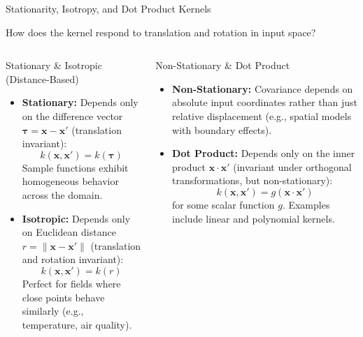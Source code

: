\documentclass[aspectratio=169, 10pt]{beamer}
\newcommand{\bx}{\mathbf{x}}
\begin{document}
\begin{frame}{Stationarity, Isotropy, and Dot Product Kernels}
  
  How does the kernel respond to translation and rotation in input space?
  
  \vspace{4pt}
  \begin{columns}[t]
      \begin{block}{Stationary \& Isotropic (Distance-Based)}
        \scriptsize
        \begin{itemize}
          \item \textbf{Stationary:} Depends only on the difference vector $\boldsymbol{\tau} = \bx - \bx'$ (translation invariant):
            \[ k(\bx, \bx') = k(\boldsymbol{\tau}) \]
            Sample functions exhibit homogeneous behavior across the domain.
          \item \textbf{Isotropic:} Depends only on Euclidean distance $r = \|\bx - \bx'\|$ (translation and rotation invariant):
            \[ k(\bx, \bx') = k(r) \]
            Perfect for fields where close points behave similarly (e.g., temperature, air quality).
        \end{itemize}
      \end{block}
      
      \begin{block}{Non-Stationary \& Dot Product}
        \scriptsize
        \begin{itemize}
          \item \textbf{Non-Stationary:} Covariance depends on absolute input coordinates rather than just relative displacement (e.g., spatial models with boundary effects).
          \item \textbf{Dot Product:} Depends only on the inner product $\bx \cdot \bx'$ (invariant under orthogonal transformations, but non-stationary):
            \[ k(\bx, \bx') = g(\bx \cdot \bx') \]
            for some scalar function $g$. Examples include linear and polynomial kernels.
        \end{itemize}
      \end{block}
  \end{columns}
\end{frame}
\end{document}
